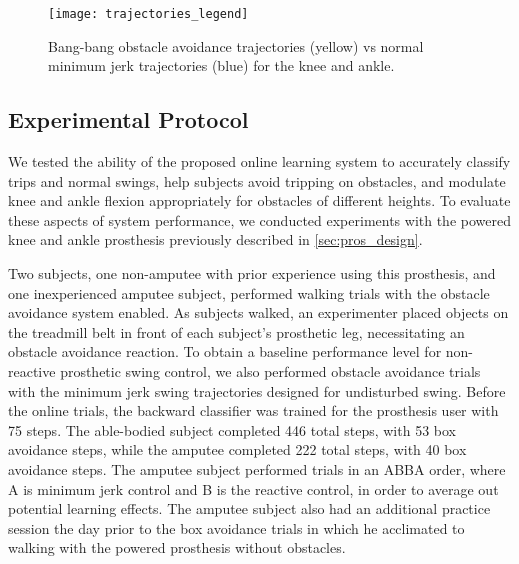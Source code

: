 \begin{figure}[tb]
\centerline{\texttt{[image: trajectories\_legend]}}
\caption[Bang-bang obstacle avoidance and minimum jerk swing
trajectories]{Bang-bang obstacle avoidance trajectories (yellow) vs normal
minimum jerk trajectories (blue) for the knee and ankle.}\label{fig:avoid_trajs}
\end{figure}

\subsection{Experimental Protocol}

We tested the ability of the proposed online learning system to accurately
classify trips and normal swings, help subjects avoid tripping on obstacles, and
modulate knee and ankle flexion appropriately for obstacles of different
heights. To evaluate these aspects of system performance, we conducted
experiments with the powered knee and ankle prosthesis previously described in
\cref{sec:pros_design}.

Two subjects, one non-amputee with prior experience using this prosthesis, and
one inexperienced amputee subject, performed walking trials with the obstacle
avoidance system enabled.  As subjects walked, an experimenter placed objects on
the treadmill belt in front of each subject's prosthetic leg, necessitating an
obstacle avoidance reaction. To obtain a baseline performance level for
non-reactive prosthetic swing control, we also performed obstacle avoidance
trials with the minimum jerk swing trajectories designed for undisturbed swing.
Before the online trials, the backward classifier was trained for the
prosthesis user with 75 steps. The able-bodied subject completed 446 total
steps, with 53 box avoidance steps, while the amputee completed 222 total steps,
with 40 box avoidance steps. The amputee subject performed trials in an ABBA
order, where A is minimum jerk control and B is the reactive control, in order
to average out potential learning effects. The amputee subject also had an
additional practice session the day prior to the box avoidance trials in which
he acclimated to walking with the powered prosthesis without obstacles.
